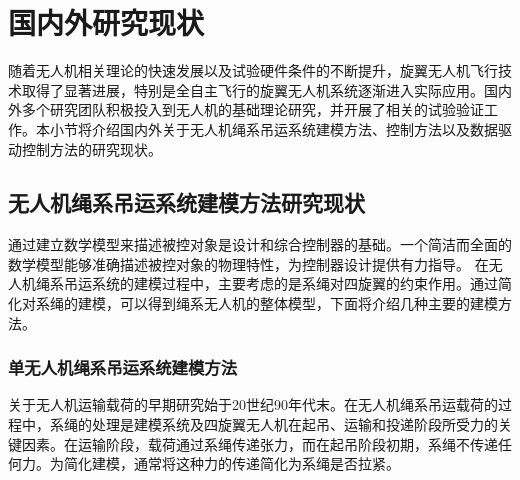 \documentclass[lang=chs, degree=master, blindreview=true, winfonts=true]{yanputhesis}
\begin{document}





\section{国内外研究现状}
随着无人机相关理论的快速发展以及试验硬件条件的不断提升，旋翼无人机飞行技术取得了显著进展，特别是全自主飞行的旋翼无人机系统逐渐进入实际应用。国内外多个研究团队积极投入到无人机的基础理论研究，并开展了相关的试验验证工作。本小节将介绍国内外关于无人机绳系吊运系统建模方法、控制方法以及数据驱动控制方法的研究现状。
\subsection{无人机绳系吊运系统建模方法研究现状}
通过建立数学模型来描述被控对象是设计和综合控制器的基础。一个简洁而全面的数学模型能够准确描述被控对象的物理特性，为控制器设计提供有力指导。
在无人机绳系吊运系统的建模过程中，主要考虑的是系绳对四旋翼的约束作用。通过简化对系绳的建模，可以得到绳系无人机的整体模型，下面将介绍几种主要的建模方法。
\subsubsection{单无人机绳系吊运系统建模方法}
关于无人机运输载荷的早期研究始于20世纪90年代末\cite{oshman1999mini,borky1997payload}。在无人机绳系吊运载荷的过程中，系绳的处理是建模系统及四旋翼无人机在起吊、运输和投递阶段所受力的关键因素\cite{qian2020guidance}。在运输阶段，载荷通过系绳传递张力，而在起吊阶段初期，系绳不传递任何力\cite{guo2020controlling}。为简化建模，通常将这种力的传递简化为系绳是否拉紧\cite{tang2018aggressive}。
\end{document}
